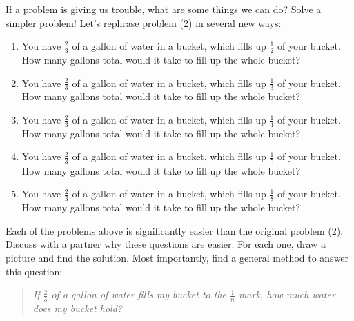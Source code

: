 If a problem is giving us trouble, what are some things we can do?  Solve a simpler problem!
Let's rephrase problem (2) in several new ways:
\begin{enumerate}[(2a)]
\item
You have $\frac 2 3$ of a gallon of water in a bucket, which fills up $\frac 1 2$ of your bucket.  How many gallons total would it take to fill up the whole bucket?\\

\item
You have $\frac 2 3$ of a gallon of water in a bucket, which fills up $\frac 1 3$ of your bucket.  How many gallons total would it take to fill up the whole bucket?\\

\item
You have $\frac 2 3$ of a gallon of water in a bucket, which fills up $\frac 1 4$ of your bucket.  How many gallons total would it take to fill up the whole bucket?\\

\item
You have $\frac 2 3$ of a gallon of water in a bucket, which fills up $\frac 1 5$ of your bucket.  How many gallons total would it take to fill up the whole bucket?\\

\item
 You have $\frac 2 3$ of a gallon of water in a bucket, which fills up $\frac 1 8$ of your bucket.  How many gallons total would it take to fill up the whole bucket?\\

\end{enumerate}

\begin{thinkpair*}
Each of the problems above is significantly easier than the original problem (2).  Discuss with a partner why these questions are easier.  For each one, draw a picture and find the solution.  Most importantly, find a general method to answer this question:

\begin{quotation}
\emph{
If $\frac 2 3$ of a gallon  of water fills my bucket to the $\frac 1 n$ mark, how much water does my bucket hold?}
\end{quotation}
\end{thinkpair*}


